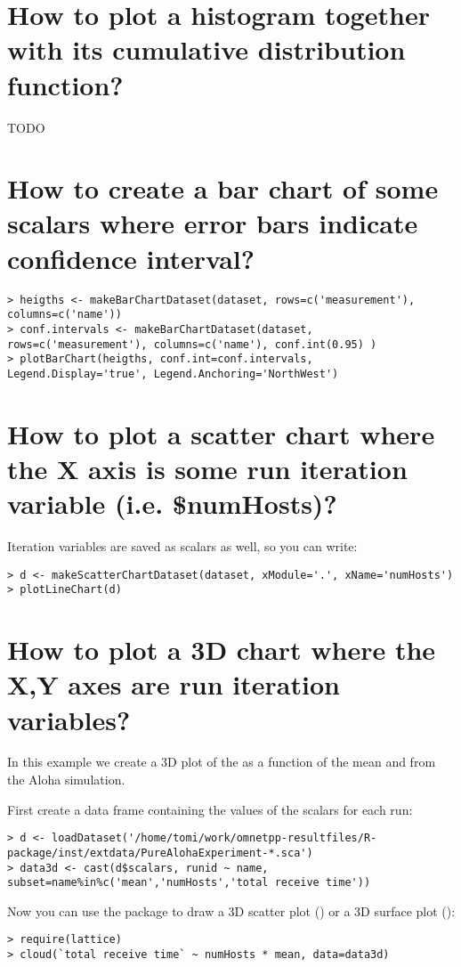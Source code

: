 \section{How to plot a histogram together with its cumulative distribution function?}

TODO

\section{How to create a bar chart of some scalars where error bars indicate confidence interval?}

\begin{verbatim}
> heigths <- makeBarChartDataset(dataset, rows=c('measurement'), columns=c('name'))
> conf.intervals <- makeBarChartDataset(dataset, rows=c('measurement'), columns=c('name'), conf.int(0.95) )
> plotBarChart(heigths, conf.int=conf.intervals, Legend.Display='true', Legend.Anchoring='NorthWest')
\end{verbatim}

\section{How to plot a scatter chart where the X axis is some run iteration
variable (i.e. \$numHosts)?}

Iteration variables are saved as scalars as well, so you can write:

\begin{verbatim}
> d <- makeScatterChartDataset(dataset, xModule='.', xName='numHosts')
> plotLineChart(d)
\end{verbatim}

\section{How to plot a 3D chart where the X,Y axes are run iteration variables?}

In this example we create a 3D plot of the  as a function
of the mean  and  from the Aloha simulation.

First create a data frame containing the values of the scalars for each run:
 
\begin{verbatim}
> d <- loadDataset('/home/tomi/work/omnetpp-resultfiles/R-package/inst/extdata/PureAlohaExperiment-*.sca')
> data3d <- cast(d$scalars, runid ~ name, subset=name%in%c('mean','numHosts','total receive time'))
\end{verbatim}

Now you can use the  package to draw a 3D scatter plot () or a
3D surface plot ():

\begin{verbatim}
> require(lattice)
> cloud(`total receive time` ~ numHosts * mean, data=data3d)
\end{verbatim}



